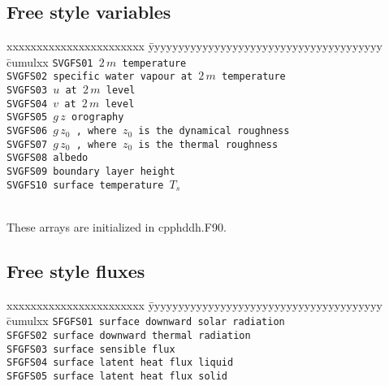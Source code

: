 \subsection{Free style variables}

\begin{tabbing}
xxxxxxxxxxxxxxxxxxxxxxx \= yyyyyyyyyyyyyyyyyyyyyyyyyyyyyyyyyyyyyyy \= cumulxx \kill
\tt SVGFS01 \>  $2 \, m$ temperature \\[1ex]
\tt SVGFS02 \>  specific water vapour at $2 \, m$ temperature \\[1ex]
\tt SVGFS03 \>  $u$ at $2 \, m$ level \\[1ex]
\tt SVGFS04 \>  $v$ at $2 \, m$ level \\[1ex]
\tt SVGFS05 \>  $g \, z$ orography \\[1ex]
\tt SVGFS06 \>  $g \, z_0$ , where $z_0$ is the dynamical roughness \\[1ex]
\tt SVGFS07 \>  $g \, z_0$ , where $z_0$ is the thermal roughness \\[1ex]
\tt SVGFS08 \>  albedo \\[1ex]
\tt SVGFS09 \>  boundary layer height \\[1ex]
\tt SVGFS10 \>  surface temperature $T_s$ \\[1ex]
\\[1ex]
\end{tabbing}

\noi These arrays are initialized in cpphddh.F90.


\subsection{Free style fluxes}

\begin{tabbing}
xxxxxxxxxxxxxxxxxxxxxxx \= yyyyyyyyyyyyyyyyyyyyyyyyyyyyyyyyyyyyyyy \= cumulxx \kill
\tt SFGFS01 \>  surface downward solar radiation  \\[1ex]
\tt SFGFS02 \>  surface downward thermal radiation  \\[1ex]
\tt SFGFS03 \>  surface sensible flux \\[1ex]
\tt SFGFS04 \>  surface latent heat flux liquid \\[1ex]
\tt SFGFS05 \>  surface latent heat flux solid \\[1ex]
\\[1ex]
\end{tabbing}


